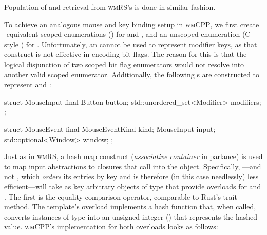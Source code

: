 Population of and retrieval from \textsc{wmRS}'s 
 is done in similar fashion.


To achieve an analogous mouse and key binding setup in \textsc{wmCPP}, we
first create \cpp{}-equivalent scoped enumerations () for
 and , and an unscoped enumeration (C-style
) for . Unfortunately, an  cannot
be used to represent modifier keys, as that construct is not effective in
encoding bit flags. The reason for this is that the logical disjunction of
two scoped bit flag enumerators would not resolve into another valid scoped
enumerator. Additionally, the following s are constructed to
represent  and :

\begin{cppblock}
  struct MouseInput final {
    Button button;
    std::unordered_set<Modifier> modifiers;
  };
\end{cppblock}
\begin{cppblock}
  struct MouseEvent final {
    MouseEventKind kind;
    MouseInput input;
    std::optional<Window> window;
  };
\end{cppblock}

Just as in \textsc{wmRS}, a hash map construct (\textit{associative container}
in \cpp parlance) is used to map input abstractions to closures that call into
the  object. Specifically, ---and not
, which \textit{orders} its entries by key and is therefore
(in this case needlessly) less efficient---will take as key arbitrary
objects of type  that provide overloads for  and
. The first is the equality comparison operator,
comparable to Rust's  trait method. The 
template's  overload implements a hash function that,
when called, converts instances of type  into an unsigned integer
() that represents the hashed value. \textsc{wmCPP}'s
implementation for both overloads looks as follows:

